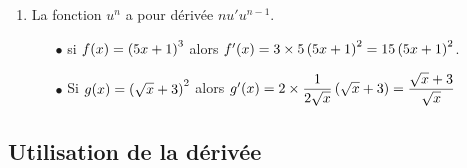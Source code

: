 \begin{corollary}
\begin{enumerate}
\bigskip

\item La fonction  $ u^{n} $ a pour dérivée  $ nu'u^{n-1} $.

\begin{example}
\begin{itemize}
\item[$  \bullet$]  si $ f(x)=\left(5x+1\right)^{3} $ \; alors \;  $ f^{\prime}(x)= 3\times 5\left(5x+1\right)^{2}=15\left(5x+1\right)^{2}$.


\item[$  \bullet$]  Si $ g(x)=\left(\sqrt{x}+3\right)^{2} $ \; alors \; $  g^{\prime}(x)= 2\times \dfrac{1}{2\sqrt{x}}\left(\sqrt{x}+3\right)=\dfrac{\sqrt{x}+3}{\sqrt{x}}$


\end{itemize}

\end{example}
\end{enumerate}
\end{corollary}

\subsection{Utilisation de la dérivée}

